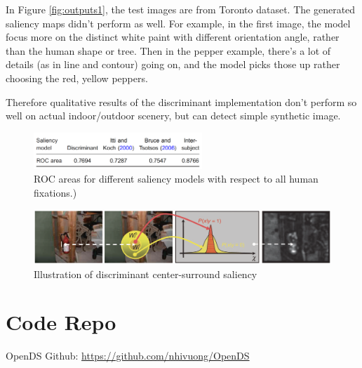 \documentclass[conference]{IEEEtran}
\begin{document}
In Figure \ref{fig:outputs1}, the test images are from Toronto dataset. The generated saliency maps didn't perform as well. For example, in the first image, the model focus more on the distinct white paint with different orientation angle, rather than the human shape or tree. Then in the pepper example, there's a lot of details (as in line and contour) going on, and the model picks those up rather choosing the red, yellow peppers.

Therefore qualitative results of the discriminant implementation don't perform so well on actual indoor/outdoor scenery, but can detect simple synthetic image. 
\begin{figure}[h]
    \centering
    \includegraphics[width=2.5in]{score.png}
    \caption{ROC areas for different saliency models with respect to all human fixations.) }
    \label{fig:ROCscore}
\end{figure}


\begin{figure}[h]
    \centering
    \includegraphics[width=6in]{research.png}
    \caption{ Illustration of discriminant center-surround saliency}
    \label{fig:centersurround}
\end{figure}

\section{Code Repo}
OpenDS Github: \url{https://github.com/nhivuong/OpenDS}



\end{document}
